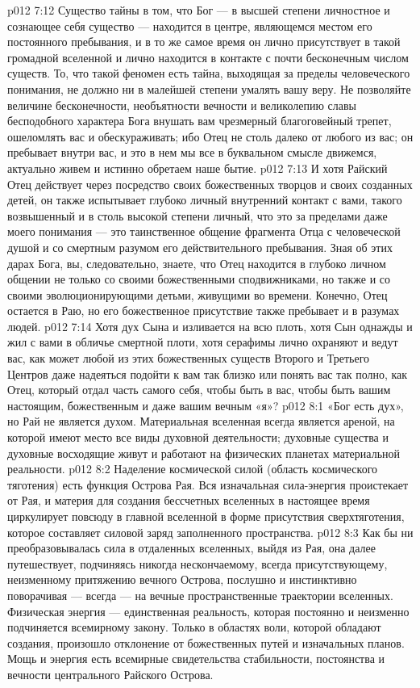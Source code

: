 \vs p012 7:12 \pc Существо тайны в том, что Бог --- в высшей степени личностное и сознающее себя существо --- находится в центре, являющемся местом его постоянного пребывания, и в то же самое время он лично присутствует в такой громадной вселенной и лично находится в контакте с почти бесконечным числом существ. То, что такой феномен есть тайна, выходящая за пределы человеческого понимания, не должно ни в малейшей степени умалять вашу веру. Не позволяйте величине бесконечности, необъятности вечности и великолепию славы бесподобного характера Бога внушать вам чрезмерный благоговейный трепет, ошеломлять вас и обескураживать; ибо Отец не столь далеко от любого из вас; он пребывает внутри вас, и это в нем мы все в буквальном смысле движемся, актуально живем и истинно обретаем наше бытие.
\vs p012 7:13 \pc И хотя Райский Отец действует через посредство своих божественных творцов и своих созданных детей, он также испытывает глубоко личный внутренний контакт с вами, такого возвышенный и в столь высокой степени личный, что это за пределами даже моего понимания --- это таинственное общение фрагмента Отца с человеческой душой и со смертным разумом его действительного пребывания. Зная об этих дарах Бога, вы, следовательно, знаете, что Отец находится в глубоко личном общении не только со своими божественными сподвижниками, но также и со своими эволюционирующими детьми, живущими во времени. Конечно, Отец остается в Раю, но его божественное присутствие также пребывает и в разумах людей.
\vs p012 7:14 Хотя дух Сына и изливается на всю плоть, хотя Сын однажды и жил с вами в обличье смертной плоти, хотя серафимы лично охраняют и ведут вас, как может любой из этих божественных существ Второго и Третьего Центров даже надеяться подойти к вам так близко или понять вас так полно, как Отец, который отдал часть самого себя, чтобы быть в вас, чтобы быть вашим настоящим, божественным и даже вашим вечным «я»?
\vs p012 8:1 «Бог есть дух», но Рай не является духом. Материальная вселенная всегда является ареной, на которой имеют место все виды духовной деятельности; духовные существа и духовные восходящие живут и работают на физических планетах материальной реальности.
\vs p012 8:2 \pc Наделение космической силой (область космического тяготения) есть функция Острова Рая. Вся изначальная сила\hyp{}энергия проистекает от Рая, и материя для создания бессчетных вселенных в настоящее время циркулирует повсюду в главной вселенной в форме присутствия сверхтяготения, которое составляет силовой заряд заполненного пространства.
\vs p012 8:3 Как бы ни преобразовывалась сила в отдаленных вселенных, выйдя из Рая, она далее путешествует, подчиняясь никогда нескончаемому, всегда присутствующему, неизменному притяжению вечного Острова, послушно и инстинктивно поворачивая --- всегда --- на вечные пространственные траектории вселенных. Физическая энергия --- единственная реальность, которая постоянно и неизменно подчиняется всемирному закону. Только в областях воли, которой обладают создания, произошло отклонение от божественных путей и изначальных планов. Мощь и энергия есть всемирные свидетельства стабильности, постоянства и вечности центрального Райского Острова.
